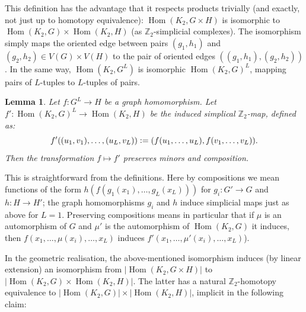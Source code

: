 \documentclass[11pt,a4paper]{scrartcl}
\numberwithin{theorem}{section}
\newtheorem{lemma}[theorem]{Lemma}
\theoremstyle{definition}
\newcommand{\ZZ}{\mathbb{Z}}
\newcommand{\defeq}{\vcentcolon=}
\DeclareMathOperator{\Hom}{Hom}
\begin{document}
This definition has the advantage that it respects products trivially (and exactly, not just up to homotopy equivalence):
$\Hom(K_2,G \times H)$ is isomorphic to $\Hom(K_2,G) \times \Hom(K_2,H)$ (as $\ZZ_2$-simplicial complexes).
The isomorphism simply maps the oriented edge between pairs $(g_1,h_1)$ and $(g_2,h_2) \in V(G) \times V(H)$ to the pair of oriented edges $((g_1,h_1),(g_2,h_2))$.
In the same way, $\Hom(K_2,G^L)$ is isomorphic $\Hom(K_2,G)^L$, mapping pairs of
$L$-tuples to $L$-tuples of pairs.

\begin{lemma}\label{lem:minionComplex}
	Let $f \colon G^L \to H$ be a graph homomorphism.
	Let $f' \colon \Hom(K_2,G)^L \to \Hom(K_2,H)$ be the induced simplical $\ZZ_2$-map, defined as:
	$$ f'((u_1,v_1),\dots,(u_L,v_L)) \defeq (f(u_1,\dots,u_L),f(v_1,\dots,v_L)).$$
	Then the transformation $f \mapsto f'$ preserves minors and composition.
\end{lemma}
This is straightforward from the definitions.
Here by compositions we mean functions of the form $h(f(g_1(x_1),\dots,g_L(x_L)))$ for $g_i\colon G' \to G$ and $h\colon H \to H'$; the graph homomorphisms $g_i$ and $h$ induce simplicial maps just as above for $L=1$.
Preserving compositions means in particular that if $\mu$ is an automorphism of $G$ and $\mu'$ is the automorphism of $\Hom(K_2,G)$ it induces, then $f(x_1,\dots,\mu(x_i),\dots,x_L)$ induces $f'(x_1,\dots,\mu'(x_i),\dots,x_L)$).

In the geometric realisation, the above-mentioned isomorphism induces (by linear extension) an isomorphism from $\left|\Hom(K_2,G \times H)\right|$
to $\left|\Hom(K_2,G) \times \Hom(K_2,H)\right|$.
The latter has a natural $\ZZ_2$-homotopy equivalence to $\left|\Hom(K_2,G)\right| \times \left|\Hom(K_2,H)\right|$, implicit in the following claim:
\end{document}
